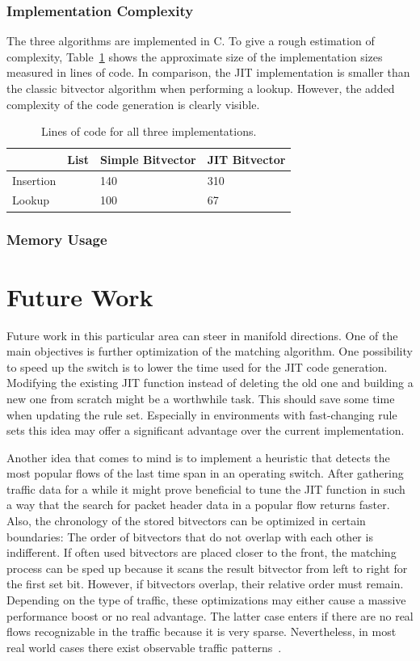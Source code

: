 \documentclass[a4paper,
		12pt,
		parskip=full,
		titlepage
		]{scrartcl}
\begin{document}
\subsubsection{Implementation Complexity}
The three algorithms are implemented in C.
To give a rough estimation of complexity, Table~\ref{table:loc} shows the 
approximate size of the implementation sizes measured in lines of code.
In comparison, the JIT implementation is smaller than the classic bitvector algorithm when performing a lookup.
However, the added complexity of the code generation is clearly visible.

\begin{table}
  \centering
  \begin{tabularx}{\textwidth}{l|XXX}
  &List&Simple Bitvector&JIT Bitvector\\
  \hline
  Insertion&&140&310\\
  Lookup&&100&67\\
  \end{tabularx}
  \caption{Lines of code for all three implementations.}
  \label{table:loc}
\end{table}

\subsubsection{Memory Usage}

\section{Future Work}
Future work in this particular area can steer in manifold directions.
One of the main objectives is further optimization of the matching algorithm.
One possibility to speed up the switch is to lower the time used for the JIT code generation.
Modifying the existing JIT function instead of deleting the old one and building 
a new one from scratch might be a worthwhile task.
This should save some time when updating the rule set.
Especially in environments with fast-changing rule sets this idea may offer 
a significant advantage over the current implementation.

Another idea that comes to mind is to implement a heuristic that detects 
the most popular flows of the last time span in an operating switch.
After gathering traffic data for a while it might prove beneficial to tune 
the JIT function in such a way that the search for packet header data in a popular flow returns faster.
Also, the chronology of the stored bitvectors can be optimized in certain boundaries:
The order of bitvectors that do not overlap with each other is indifferent.
If often used bitvectors are placed closer to the front, the matching process 
can be sped up because it scans the result bitvector from left to right for the first set bit.
However, if bitvectors overlap, their relative order must remain.
Depending on the type of traffic, these optimizations may either cause a massive performance boost or no real advantage.
The latter case enters if there are no real flows recognizable in the traffic because it is very sparse.
Nevertheless, in most real world cases there exist observable traffic patterns~\cite{elephantmice}.

\newpage
{}


\end{document}
